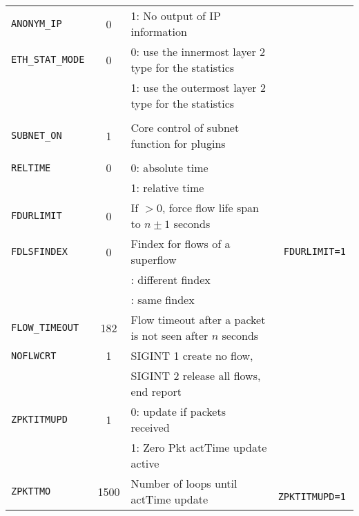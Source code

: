 \begin{longtable}{>{\tt}lcl>{\tt\small}l}
    ANONYM\_IP               & 0                  & 1: No output of IP information                                      & \\
    ETH\_STAT\_MODE          & 0                  & 0: use the innermost layer 2 type for the statistics                & \\
                             &                    & 1: use the outermost layer 2 type for the statistics                & \\
    \\
    SUBNET\_ON               & 1                  & Core control of subnet function for plugins                         & \\
    \\
    RELTIME                  & 0                  & 0: absolute time                                                    & \\
                             &                    & 1: relative time                                                    & \\
    FDURLIMIT                & 0                  & If $>0$, force flow life span to $n\pm1$ seconds                    & \\
    FDLSFINDEX               & 0                  & Findex for flows of a superflow                                     & FDURLIMIT=1\\
                             &                    & \qquad 0: different findex                                          & \\
                             &                    & \qquad 1: same findex                                               & \\
    FLOW\_TIMEOUT            & 182                & Flow timeout after a packet is not seen after $n$ seconds           & \\
    NOFLWCRT                 & 1                  & SIGINT 1 create no flow,                                            & \\
                             &                    & SIGINT 2 release all flows, end report                              & \\
    ZPKTITMUPD               & 1                  & 0: update if packets received                                       & \\
                             &                    & 1: Zero Pkt actTime update active                                   & \\
    ZPKTTMO                  & 1500               & Number of loops until actTime update                                & ZPKTITMUPD=1\\

\end{longtable}
